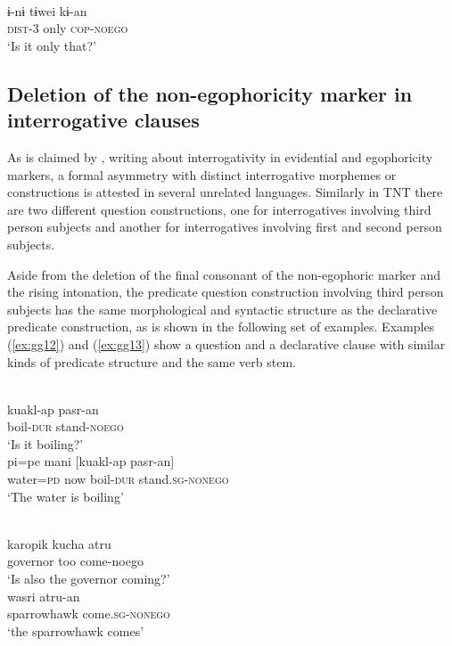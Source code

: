 \documentclass[output=paper]{langsci/langscibook}
\begin{document}
	
\ea \label{ex:gg11}
    \\
	\gll ɨ-nɨ tɨwei	kɨ-an\\
      \textsc{dist}-3 only \textsc{cop-noego}\\
	\glt ‘Is it only that?’
	\z


\subsection{Deletion of the non-egophoricity marker in interrogative clauses}\label{s:gg1-3}

As is claimed by \citealt{SanRoque2018}, writing about interrogativity in evidential and egophoricity markers, a formal asymmetry with distinct interrogative morphemes or constructions is attested in several unrelated languages. Similarly in TNT there are two different question constructions, one for interrogatives involving third person subjects and another for interrogatives involving first and second person subjects.

Aside from the deletion of the final consonant of the non-egophoric marker and the rising intonation, the predicate question construction involving third person subjects has the same morphological and syntactic structure as the declarative predicate construction, as is shown in the following set of examples. Examples (\ref{ex:gg12}) and (\ref{ex:gg13}) show a question and a declarative clause with similar kinds of predicate structure and the same verb stem. 

\ea \label{ex:gg12} \ea
    \\
    \gll kuakl-ap pasr-an\\
         boil-\textsc{dur} stand-\textsc{noego}\\
    \glt ‘Is it boiling?’
  \ex
  \\
    \gll pi=pe mani [kuakl-ap pasr-an]\\
         water=\textsc{pd}	now	boil-\textsc{dur} stand.\textsc{sg-nonego}\\
    \glt ‘The water is boiling’
\z \z

\ea \label{ex:gg13} \ea
    \\
    \gll karopik	kucha	atru\\
         governor	too	come-noego\\
    \glt ‘Is also the governor coming?’
  \ex
  \\
    \gll wasri	atru-an\\
         sparrowhawk come.\textsc{sg-nonego}\\
    \glt ‘the sparrowhawk comes’
\z \z
\end{document}
